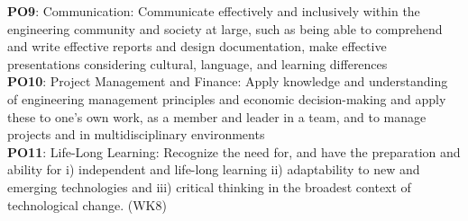 \begin{titlepage}
{\textbf{PO9}: Communication: Communicate effectively and inclusively within the engineering community and society at large, such as being able to comprehend and write effective reports and design documentation, make effective presentations considering cultural, language, and learning differences\\
\textbf{PO10}: Project Management and Finance: Apply knowledge and understanding of engineering management principles and economic decision-making and apply these to one’s own work, as a member and leader in a team, and to manage projects and in multidisciplinary environments\\
\textbf{PO11}: Life-Long Learning: Recognize the need for, and have the preparation and ability for i) independent and life-long learning ii) adaptability to new and emerging technologies and iii) critical thinking in the broadest context of technological change. (WK8)}
\end{titlepage}